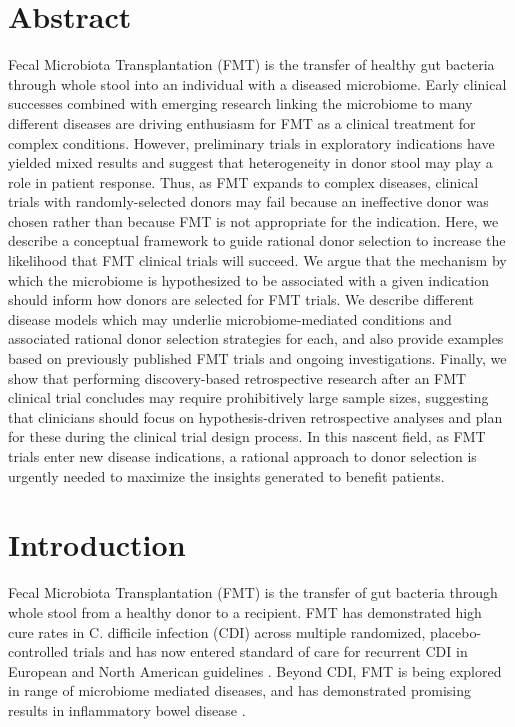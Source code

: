 \section*{Abstract}

Fecal Microbiota Transplantation (FMT) is the transfer of healthy gut bacteria through whole stool into an individual with a diseased microbiome.
Early clinical successes combined with emerging research linking the microbiome to many different diseases are driving enthusiasm for FMT as a clinical treatment for complex conditions.
However, preliminary trials in exploratory indications have yielded mixed results and suggest that heterogeneity in donor stool may play a role in patient response.
Thus, as FMT expands to complex diseases, clinical trials with randomly-selected donors may fail because an ineffective donor was chosen rather than because FMT is not appropriate for the indication.
Here, we describe a conceptual framework to guide rational donor selection to increase the likelihood that FMT clinical trials will succeed.
We argue that the mechanism by which the microbiome is hypothesized to be associated with a given indication should inform how donors are selected for FMT trials.
We describe different disease models which may underlie microbiome-mediated conditions and associated rational donor selection strategies for each, and also provide examples based on previously published FMT trials and ongoing investigations.
Finally, we show that performing discovery-based retrospective research after an FMT clinical trial concludes may require prohibitively large sample sizes, suggesting that clinicians should focus on hypothesis-driven retrospective analyses and plan for these during the clinical trial design process.
In this nascent field, as FMT trials enter new disease indications, a rational approach to donor selection is urgently needed to maximize the insights generated to benefit patients.

\newpage

\section{Introduction}

Fecal Microbiota Transplantation (FMT) is the transfer of gut bacteria through whole stool from a healthy donor to a recipient.
FMT has demonstrated high cure rates in C. difficile infection (CDI) across multiple randomized, placebo-controlled trials \cite{Quraishi2017} and has now entered standard of care for recurrent CDI in European and North American guidelines \cite{McDonald2018,Cammarota2017,Surawicz2013}.
Beyond CDI, FMT is being explored in range of microbiome mediated diseases, and has demonstrated promising results in inflammatory bowel disease \cite{Panchal2018,Gelfand2018,Kootte2017,Osman2018,Costello2017,Paramsothy2017}.

